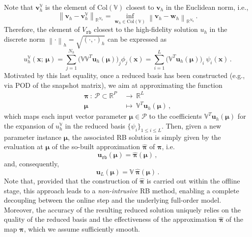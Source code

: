 \documentclass[longtitle]{elsarticle}
\numberwithin{equation}{section}
\theoremstyle{theorem}
\theoremstyle{definition}
\theoremstyle{remark}
\theoremstyle{proposition}
\numberwithin{figure}{section}
\newcommand{\norm}[1]{\left\lVert#1\right\rVert}
\newcommand{\bg}[1]{\boldsymbol{#1}}
\begin{document}
		Note that $\mathbf{v}_h^{\mathbb{V}}$ is the element of $\text{Col}(\mathbb{V})$ closest to $\mathbf{v}_h$ in the Euclidean norm, i.e.,
		\begin{equation*}
			\norm{\mathbf{v}_h - \mathbf{v}_h^{\mathbb{V}}}_{\mathbb{R}^{N_h}} = \inf_{\mathbf{w}_h \in \text{Col}(\mathbb{V})} \norm{\mathbf{v}_h - \mathbf{w}_h}_{\mathbb{R}^{N_h}} \, .
		\end{equation*}
		Therefore, the element of $V_{\texttt{rb}}$ closest to the high-fidelity solution $u_h$ in the discrete norm $\norm{\cdot}_h = \sqrt{(\cdot,\cdot)_h}$ can be expressed as
		\begin{equation*}
			\label{eq:high-fidelity-projected}
			u^{\mathbb{V}}_h(\bg{x}; \, \bg{\mu}) = \sum_{j = 1}^{N_h} \big( \mathbb{V} \mathbb{V}^T \mathbf{u}_h(\bg{\mu}) \big)_j \phi_j(\bg{x}) = \sum_{i = 1}^L \big( \mathbb{V}^T \mathbf{u}_h(\bg{\mu}) \big)_i ~ \psi_i(\bg{x}) \, .
		\end{equation*} 
		Motivated by this last equality, once a reduced basis has been constructed (e.g., via POD of the snapshot matrix), we aim at approximating the function
		\begin{equation}
			\label{eq:map-to-approximate}
			\begin{aligned}
				\bg{\pi} ~ : ~ \mathcal{P} \subset \mathbb{R}^P ~ & \rightarrow ~ \mathbb{R}^L \\
				\bg{\mu} ~~ & \mapsto ~ \mathbb{V}^T \mathbf{u}_h(\bg{\mu}) \, ,
			\end{aligned}
		\end{equation}
		which maps each input vector parameter $\bg{\mu} \in \mathcal{P}$ to the coefficients $\mathbb{V}^T \mathbf{u}_h(\bg{\mu})$ for the expansion of $u^{\mathbb{V}}_h$ in the reduced basis $\big\lbrace \psi_i \big\rbrace_{1 \leq i \leq L}$. Then, given a new parameter instance $\bg{\mu}$, the associated RB solution is simply given by the evaluation at $\bg{\mu}$ of the so-built approximation $\hat{\bg{\pi}}$ of $\bg{\pi}$, i.e.
		\begin{equation*}
			\mathbf{u}_{\texttt{rb}}(\bg{\mu}) = \hat{\bg{\pi}}(\bg{\mu}) \, ,
		\end{equation*}
		and, consequently,
		\begin{equation*}
			\mathbf{u}_L(\bg{\mu}) = \mathbb{V} ~ \hat{\bg{\pi}}(\bg{\mu}) \, .
		\end{equation*}
		Note that, provided that the construction of $\hat{\bg{\pi}}$ is carried out within the offline stage, this approach leads to a \emph{non-intrusive} RB method, enabling a complete decoupling between the online step and the underlying full-order model. Moreover, the accuracy of the resulting reduced solution uniquely relies on the quality of the reduced basis and the effectiveness of the approximation $\hat{\bg{\pi}}$ of the map $\bg{\pi}$, which we assume sufficiently smooth. 
\end{document}
